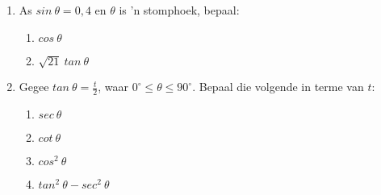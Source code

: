\begin{exercises}{}
{\begin{enumerate}[itemsep=5pt, label=\textbf{\arabic*}. ]
\item As $sin~\theta= 0,4$ en $\theta$ is 'n stomphoek, bepaal:
\begin{enumerate}[noitemsep, label=\textbf{(\alph*)} ]
 \item $cos~\theta$
\item $\sqrt{21}~tan~\theta$
\end{enumerate}
\item Gegee $tan~ \theta = \frac{t}{2}$, waar $0^{\circ} \leq \theta \leq 90^{\circ}$. Bepaal die volgende in terme van $t$:
\begin{enumerate}[noitemsep, label=\textbf{(\alph*)} ]
\item $sec~ \theta$
\item $cot~ \theta$
\item $cos^2~ \theta$
\item $tan^2~ \theta-sec^2~ \theta$
\end{enumerate}
\end{enumerate}

}
\end{exercises}


